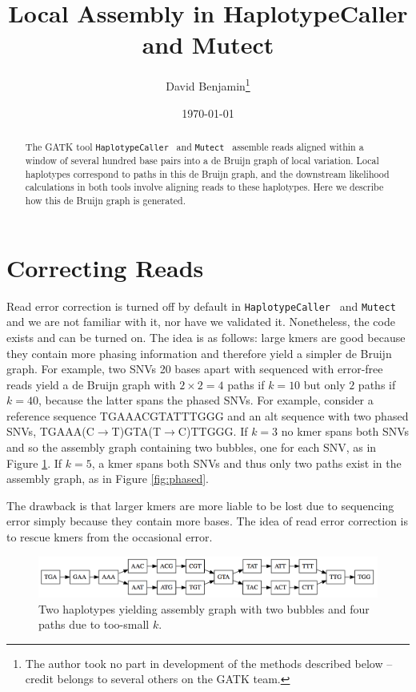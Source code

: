 \documentclass[nofootinbib,amssymb,amsmath]{revtex4}
\newcommand{\HC}{\texttt{HaplotypeCaller}}
\newcommand{\Mutect}{\texttt{Mutect}}
\begin{document}
\title{Local Assembly in HaplotypeCaller and Mutect}
\author{David Benjamin\footnote{The author took no part in development of the methods described below -- credit belongs to several others on the GATK team. }}

\date{\today}

\begin{abstract}
The GATK tool \HC~ and \Mutect~ assemble reads aligned within a window of several hundred base pairs into a de Bruijn graph of local variation.  Local haplotypes correspond to paths in this de Bruijn graph, and the downstream likelihood calculations in both tools involve aligning reads to these haplotypes.  Here we describe how this de Bruijn graph is generated.
\end{abstract}

\maketitle

\section{Correcting Reads} \label{correcting-reads}
Read error correction is turned off by default in \HC~ and \Mutect~ and we are not familiar with it, nor have we validated it.  Nonetheless, the code exists and can be turned on.  The idea is as follows: large kmers are good because they contain more phasing information and therefore yield a simpler de Bruijn graph.  For example, two SNVs 20 bases apart with sequenced with error-free reads yield a de Bruijn graph with $2 \times 2 = 4$ paths if $k = 10$ but only $2$ paths if $k = 40$, because the latter spans the phased SNVs.  For example, consider a reference sequence TGAAACGTATTTGGG and an alt sequence with two phased SNVs, TGAAA(C$\rightarrow$T)GTA(T$\rightarrow$C)TTGGG.  If $k=3$ no kmer spans both SNVs and so the assembly graph containing two bubbles, one for each SNV, as in Figure \ref{fig:unphased}.  If $k = 5$, a kmer spans both SNVs and thus only two paths exist in the assembly graph, as in Figure \ref{fig:phased}.


The drawback is that larger kmers are more liable to be lost due to sequencing error simply because they contain more bases.  The idea of read error correction is to rescue kmers from the occasional error.

\begin{figure}
\center
\includegraphics[scale=0.5]{unphased_graph.png}
\caption{Two haplotypes yielding assembly graph with two bubbles and four paths due to too-small $k$.}
\label{fig:unphased}
\end{figure}
\end{document}
